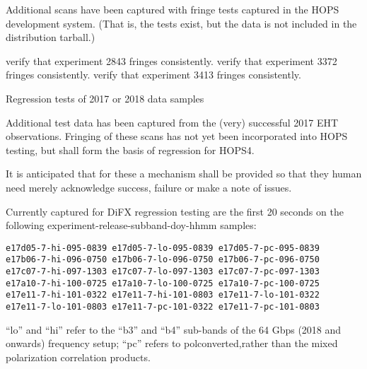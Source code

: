 Additional scans have been captured with fringe tests captured
in the \ac{HOPS} development system.  (That is, the tests exist,
but the data is not included in the distribution tarball.)


\begin{description}
 verify that experiment 2843 fringes consistently.
 verify that experiment 3372 fringes consistently.
 verify that experiment 3413 fringes consistently.

 Regression tests of 2017 or 2018 data samples

\end{description}

Additional test data has been captured from the (very) successful
2017 \ac{EHT} observations.  Fringing of these scans has not yet
been incorporated into HOPS testing, but shall form the basis
of regression for HOPS4.

It is anticipated that for these a mechanism shall be provided
so that they human need merely acknowledge success, failure or
make a note of issues.

Currently captured for \acs{DiFX} regression testing are the first 20 seconds
on the following experiment-release-subband-doy-hhmm samples:
\begin{verbatim}
e17d05-7-hi-095-0839 e17d05-7-lo-095-0839 e17d05-7-pc-095-0839
e17b06-7-hi-096-0750 e17b06-7-lo-096-0750 e17b06-7-pc-096-0750
e17c07-7-hi-097-1303 e17c07-7-lo-097-1303 e17c07-7-pc-097-1303
e17a10-7-hi-100-0725 e17a10-7-lo-100-0725 e17a10-7-pc-100-0725
e17e11-7-hi-101-0322 e17e11-7-hi-101-0803 e17e11-7-lo-101-0322
e17e11-7-lo-101-0803 e17e11-7-pc-101-0322 e17e11-7-pc-101-0803
\end{verbatim}
``lo'' and ``hi'' refer to the ``b3'' and ``b4'' sub-bands of the
64 \acs{Gbps} (2018 and onwards) frequency setup; ``pc'' refers to polconverted,rather than the mixed polarization correlation products.

